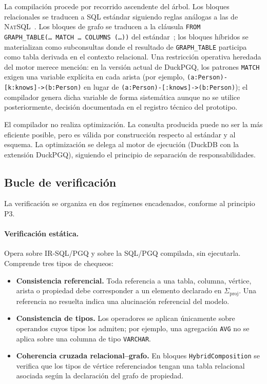 La compilación procede por recorrido ascendente del árbol. Los bloques relacionales se traducen a \ac{SQL} estándar siguiendo reglas análogas a las de \textsc{NatSQL}~\cite{IRNet}.
Los bloques de grafo se traducen a la cláusula \texttt{FROM GRAPH\_TABLE(\ldots\ MATCH \ldots\ COLUMNS (\ldots))} del estándar~\cite{DuckPGQ}; los bloques híbridos se materializan como subconsultas donde el resultado de \texttt{GRAPH\_TABLE} participa como tabla derivada en el contexto relacional. Una restricción operativa heredada del motor merece mención: en la versión actual de DuckPGQ, los patrones \texttt{MATCH} exigen una variable explícita en cada arista (por ejemplo, \texttt{(a:Person)-[k:knows]->(b:Person)} en lugar de \texttt{(a:Person)-[:knows]->(b:Person)}); el compilador genera dicha variable de forma sistemática aunque no se utilice posteriormente, decisión documentada en el registro técnico del prototipo.

El compilador no realiza optimización. La consulta producida puede no ser la más eficiente posible, pero es válida por construcción respecto al estándar y al esquema. La optimización se delega al motor de ejecución (DuckDB con la extensión DuckPGQ), siguiendo el principio de separación de responsabilidades.

\subsection{Bucle de verificación}
\label{subsec:prop-verificacion}

La verificación se organiza en dos regímenes encadenados, conforme al principio P3.

\paragraph{Verificación estática.} Opera sobre IR-SQL/PGQ y sobre la \ac{SQL}/\ac{PGQ} compilada, sin ejecutarla. Comprende tres tipos de chequeos:

\begin{itemize}
    \item \textbf{Consistencia referencial.} Toda referencia a una tabla, columna, vértice, arista o propiedad debe corresponder a un elemento declarado en $\Sigma_{\mathrm{proj}}$. Una referencia no resuelta indica una alucinación referencial del modelo.
    \item \textbf{Consistencia de tipos.} Los operadores se aplican únicamente sobre operandos cuyos tipos los admiten; por ejemplo, una agregación \texttt{AVG} no se aplica sobre una columna de tipo \texttt{VARCHAR}.
    \item \textbf{Coherencia cruzada relacional--grafo.} En bloques \texttt{HybridComposition} se verifica que los tipos de vértice referenciados tengan una tabla relacional asociada según la declaración del grafo de propiedad.
\end{itemize}

